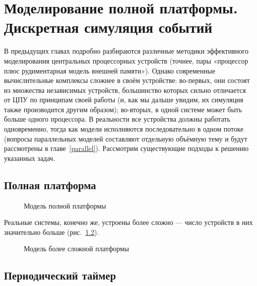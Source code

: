\chapter[Моделирование полной платформы]{Моделирование полной платформы. Дискретная симуляция событий}\label{fullplatform}


В предыдущих главах подробно разбираются различные методики эффективного моделирования центральных процессорных устройств (точнее, пары «процессор плюс рудиментарная модель внешней памяти»). Однако современные вычислительные комплексы сложнее в своём устройстве: во-первых, они  состоят из множества независимых устройств, большинство которых сильно отличается от ЦПУ по принципам своей работы (и, как мы дальше увидим, их симуляция также производится  другим образом); во-вторых, в одной системе может быть больше одного процессора. В реальности все устройства должны работать одновременно, тогда как модели исполняются последовательно в одном потоке (вопросы параллельных моделей составляют отдельную объёмную тему и будут рассмотрены в главе~\ref{parallel}). Рассмотрим существующие подходы к решению указанных задач.

\section{Полная платформа}

\begin{figure}[htp]
    \centering
    \caption[Модель полной платформы]{Модель полной платформы}
    \label{fig:full-platform}
\end{figure}

Реальные системы, конечно же, устроены более сложно — число устройств в них значительно больше (рис.~\ref{fig:real-full-platform}).

\begin{figure}[htp]
    \centering
    \caption[Модель более сложной платформы]{Модель более сложной платформы}
    \label{fig:real-full-platform}
\end{figure}


\section{Периодический таймер}


